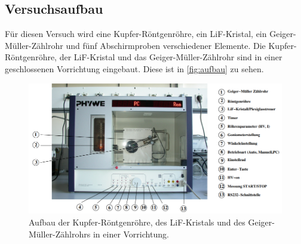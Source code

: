 \subsection{Versuchsaufbau}
\label{subsec:Versuchsaufbau}
Für diesen Versuch wird eine Kupfer-Röntgenröhre, ein LiF-Kristal, ein Geiger-Müller-Zählrohr und fünf Abschirmproben verschiedener Elemente. 
Die Kupfer-Röntgenröhre, der LiF-Kristal und das Geiger-Müller-Zählrohr sind in einer geschlossenen Vorrichtung eingebaut. Diese ist in \autoref{fig:aufbau} zu sehen.
\begin{figure}
    \centering
    \includegraphics[width = \textwidth]{content/aufbauskizze.PNG}
    \caption{Aufbau der Kupfer-Röntgenröhre, des LiF-Kristals und des Geiger-Müller-Zählrohrs in einer Vorrichtung. \cite{v602}}
    \label{fig:aufbau}
\end{figure}
